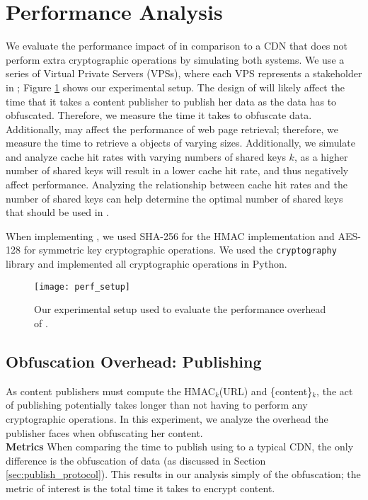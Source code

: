 \section{Performance Analysis}
\label{sec:performance}

We evaluate the performance impact of \system{} in comparison to a CDN that does not perform extra cryptographic operations by simulating both systems.   
We use a series of Virtual Private Servers (VPSs), where each VPS represents a stakeholder in \system{}; Figure \ref{fig:perf_setup} shows our 
experimental setup.  The design of \system{} will likely affect the time that it takes a content publisher to publish her data as
the data has to obfuscated.  Therefore, we measure the time it takes to obfuscate data.  Additionally, \system{} may affect the performance of web page retrieval; therefore, we measure the time to retrieve a objects of varying sizes.  Additionally, we simulate and analyze cache hit rates with varying numbers of 
shared keys $k$, as a higher number of shared keys will result in a lower cache hit rate, and thus negatively affect performance. Analyzing the relationship between cache hit
rates and the number of shared keys can help determine the optimal number of shared keys that should be used in \system{}.

When implementing \system{}, we used SHA-256 for the HMAC implementation and AES-128 for symmetric key cryptographic operations.  We used the {\tt cryptography} library and implemented 
all cryptographic operations in Python.  

\begin{figure}[t]
\centering
\texttt{[image: perf\_setup]}
\caption{Our experimental setup used to evaluate the performance overhead of \system{}.}
\label{fig:perf_setup}
\end{figure}

\subsection{Obfuscation Overhead: Publishing}
As content publishers must compute the HMAC$_k$(URL) and \{content\}$_k$, the act of publishing potentially 
takes longer than not having to perform any cryptographic operations.  In this experiment, we analyze the overhead 
the publisher faces when obfuscating her content.\\

{\bf Metrics}
When comparing the time to publish using \system{} to a typical CDN, the only difference is the obfuscation of 
data (as discussed in Section \ref{sec:publish_protocol}).  This results in our analysis simply of the 
obfuscation; the metric of interest is the total time it takes to encrypt content.  \\

